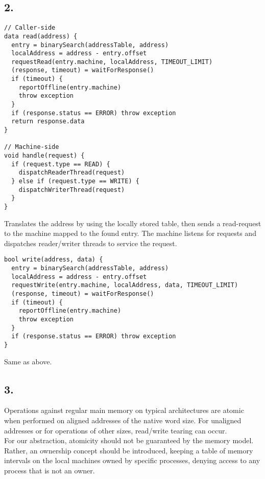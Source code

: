 \documentclass[12pt]{article}
\begin{document}
\subsection*{2.} %

\begin{verbatim}
// Caller-side
data read(address) {
  entry = binarySearch(addressTable, address)
  localAddress = address - entry.offset
  requestRead(entry.machine, localAddress, TIMEOUT_LIMIT)
  (response, timeout) = waitForResponse()
  if (timeout) {
    reportOffline(entry.machine)
    throw exception
  }
  if (response.status == ERROR) throw exception
  return response.data
}

// Machine-side
void handle(request) {
  if (request.type == READ) {
    dispatchReaderThread(request)
  } else if (request.type == WRITE) {
    dispatchWriterThread(request)
  }
}
\end{verbatim}

\noindent Translates the address by using the locally stored table, then sends a read-request to the machine mapped to the found entry. The machine listens for requests and dispatches reader/writer threads to service the request.

\begin{verbatim}
bool write(address, data) {
  entry = binarySearch(addressTable, address)
  localAddress = address - entry.offset
  requestWrite(entry.machine, localAddress, data, TIMEOUT_LIMIT)
  (response, timeout) = waitForResponse()
  if (timeout) {
    reportOffline(entry.machine)
    throw exception
  }
  if (response.status == ERROR) throw exception
}
\end{verbatim}

\noindent Same as above.

\subsection*{3.} %

Operations against regular main memory on typical architectures are atomic when performed on aligned addresses of the native word size. For unaligned addresses or for operations of other sizes, read/write tearing can occur. \\
For our abstraction, atomicity should not be guaranteed by the memory model. Rather, an ownership concept should be introduced, keeping a table of memory intervals on the local machines owned by specific processes, denying access to any process that is not an owner.
\end{document}
